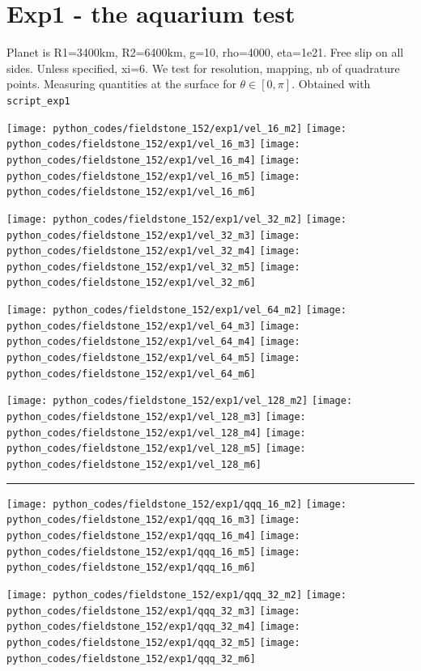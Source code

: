 \newpage
\section*{Exp1 - the aquarium test}

Planet is R1=3400km, R2=6400km, g=10, rho=4000, eta=1e21.
Free slip on all sides. Unless specified, xi=6.
We test for resolution, mapping, nb of quadrature points.
Measuring quantities at the surface for $\theta\in[0,\pi]$.
Obtained with {\tt script\_exp1}


\noindent
\texttt{[image: python\_codes/fieldstone\_152/exp1/vel\_16\_m2]}
\texttt{[image: python\_codes/fieldstone\_152/exp1/vel\_16\_m3]}
\texttt{[image: python\_codes/fieldstone\_152/exp1/vel\_16\_m4]}
\texttt{[image: python\_codes/fieldstone\_152/exp1/vel\_16\_m5]}
\texttt{[image: python\_codes/fieldstone\_152/exp1/vel\_16\_m6]}

\noindent
\texttt{[image: python\_codes/fieldstone\_152/exp1/vel\_32\_m2]}
\texttt{[image: python\_codes/fieldstone\_152/exp1/vel\_32\_m3]}
\texttt{[image: python\_codes/fieldstone\_152/exp1/vel\_32\_m4]}
\texttt{[image: python\_codes/fieldstone\_152/exp1/vel\_32\_m5]}
\texttt{[image: python\_codes/fieldstone\_152/exp1/vel\_32\_m6]}

\noindent
\texttt{[image: python\_codes/fieldstone\_152/exp1/vel\_64\_m2]}
\texttt{[image: python\_codes/fieldstone\_152/exp1/vel\_64\_m3]}
\texttt{[image: python\_codes/fieldstone\_152/exp1/vel\_64\_m4]}
\texttt{[image: python\_codes/fieldstone\_152/exp1/vel\_64\_m5]}
\texttt{[image: python\_codes/fieldstone\_152/exp1/vel\_64\_m6]}

\noindent
\texttt{[image: python\_codes/fieldstone\_152/exp1/vel\_128\_m2]}
\texttt{[image: python\_codes/fieldstone\_152/exp1/vel\_128\_m3]}
\texttt{[image: python\_codes/fieldstone\_152/exp1/vel\_128\_m4]}
\texttt{[image: python\_codes/fieldstone\_152/exp1/vel\_128\_m5]}
\texttt{[image: python\_codes/fieldstone\_152/exp1/vel\_128\_m6]}

\hrule

\noindent
\texttt{[image: python\_codes/fieldstone\_152/exp1/qqq\_16\_m2]}
\texttt{[image: python\_codes/fieldstone\_152/exp1/qqq\_16\_m3]}
\texttt{[image: python\_codes/fieldstone\_152/exp1/qqq\_16\_m4]}
\texttt{[image: python\_codes/fieldstone\_152/exp1/qqq\_16\_m5]}
\texttt{[image: python\_codes/fieldstone\_152/exp1/qqq\_16\_m6]}

\noindent
\texttt{[image: python\_codes/fieldstone\_152/exp1/qqq\_32\_m2]}
\texttt{[image: python\_codes/fieldstone\_152/exp1/qqq\_32\_m3]}
\texttt{[image: python\_codes/fieldstone\_152/exp1/qqq\_32\_m4]}
\texttt{[image: python\_codes/fieldstone\_152/exp1/qqq\_32\_m5]}
\texttt{[image: python\_codes/fieldstone\_152/exp1/qqq\_32\_m6]}

